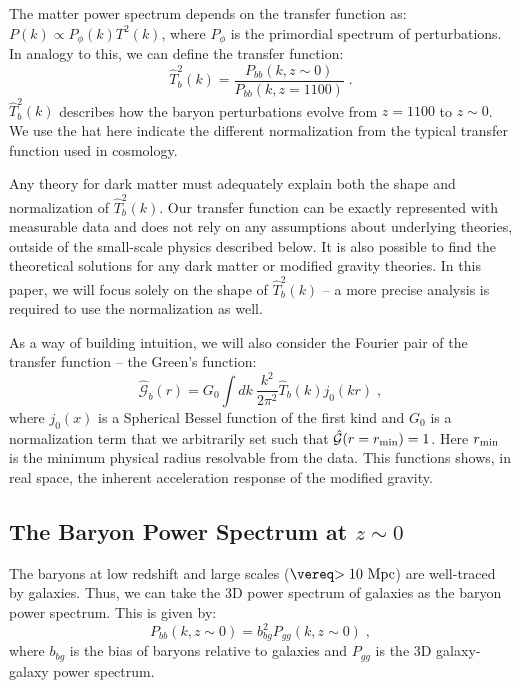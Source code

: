 \documentclass[12pt,floats,floatfix,showpacs,amssymb,amsmath,prl,superscriptaddress,nofootinbib, aps]{revtex4-2}
\begin{document}
The matter power spectrum depends on the transfer function as: $P(k) \propto P_{\phi}(k)T^2(k)$, where $P_{\phi}$ is the primordial spectrum of perturbations. In analogy to this, we can define the transfer function:
\begin{equation}
    \hat{T}_b^2(k) = \frac{P_{bb}(k, z\sim 0)}{P_{bb}(k,z=1100)} \; .
\end{equation}
$\hat{T}_b^2(k)$ describes how the baryon perturbations evolve from $z=1100$ to $z\sim 0$. We use the hat here indicate the different normalization from the typical transfer function used in cosmology.

Any theory for dark matter must adequately explain both the shape and normalization of $\hat{T}_b^2(k)$. Our transfer function can be exactly represented with measurable data and does not rely on any assumptions about underlying theories, outside of the small-scale physics described below. It is also possible to find the theoretical solutions for any dark matter or modified gravity theories. In this paper, we will focus solely on the shape of $\hat{T}_b^2(k)$ -- a more precise analysis is required to use the normalization as well.

As a way of building intuition, we will also consider the Fourier pair of the transfer function -- the Green's function:
\begin{equation}\label{eqn:greens}
    \hat{\mathcal{G}}_b(r) = G_0\int dk\ \frac{k^2}{2\pi^2} \hat{T}_b(k) j_0(kr) \; ,
\end{equation}
where $j_0(x)$ is a Spherical Bessel function of the first kind and $G_0$ is a normalization term that we arbitrarily set such that $\hat{\mathcal{G}}(r=r_{\rm{min}}) = 1$. Here $r_{\rm{min}}$ is the minimum physical radius resolvable from the data. This functions shows, in real space, the inherent acceleration response of the modified gravity. 


\subsection{The Baryon Power Spectrum at $z\sim0$}\label{sec:theory-lowz}
The baryons at low redshift and large scales ($\gtrsim 10~\rm{Mpc}$) are well-traced by galaxies. Thus, we can take the 3D power spectrum of galaxies as the baryon power spectrum. This is given by:
\begin{equation}
    P_{bb}(k, z\sim 0) = b_{bg}^2 P_{gg}(k, z\sim 0) \; ,
\end{equation}
where $b_{bg}$ is the bias of baryons relative to galaxies and $P_{gg}$ is the 3D galaxy-galaxy power spectrum. 
\end{document}
